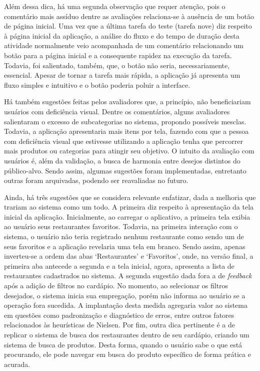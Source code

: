 Além dessa dica, há uma segunda observação que requer atenção, pois o comentário mais assíduo dentre as avaliações relaciona-se à ausência de um botão de página inicial. Uma vez que a última tarefa do teste (tarefa nove) diz respeito à página inicial da aplicação, a análise do fluxo e do tempo de duração desta atividade normalmente veio acompanhada de um comentário relacionando um botão para a página inicial e a consequente rapidez na execução da tarefa. Todavia, foi salientado, também, que, o botão não seria, necessariamente, essencial. Apesar de tornar a tarefa mais rápida, a aplicação já apresenta um fluxo simples e intuitivo e o botão poderia poluir a interface.

Há também sugestões feitas pelos avaliadores que, a princípio, não beneficiariam usuários com deficiência visual. Dentre os comentários, alguns avaliadores salientaram o excesso de subcategorias no sistema, propondo possíveis mesclas. Todavia, a aplicação apresentaria mais itens por tela, fazendo com que a pessoa com deficiência visual que estivesse utilizando a aplicação tenha que percorrer mais produtos ou categorias para atingir seu objetivo. O intuito da avaliação com usuários é, além da validação, a busca de harmonia entre desejos distintos do público-alvo. Sendo assim, algumas sugestões foram implementadas, entretanto outras foram arquivadas, podendo ser reavaliadas no futuro.

Ainda, há três sugestões que se considera relevante enfatizar, dada a melhoria que trariam ao sistema como um todo. A primeira diz respeito à apresentação da tela inicial da aplicação. Inicialmente, ao carregar o aplicativo, a primeira tela exibia ao usuário seus restaurantes favoritos. Todavia, na primeira interação com o sistema, o usuário não teria registrado nenhum restaurante como sendo um de seus favoritos e a aplicação revelaria uma tela em branco. Sendo assim, apenas inverteu-se a ordem das abas ‘Restaurantes’ e ‘Favoritos’, onde, na versão final, a primeira aba antecede a segunda e a tela inicial, agora, apresenta a lista de restaurantes cadastrados no sistema. A segunda sugestão dada fora a de \emph{feedback} após a adição de filtros no cardápio. No momento, ao selecionar os filtros desejados, o sistema inicia sua empregação, porém não informa ao usuário se a operação fora sucedida. A implantação desta medida agregaria valor ao sistema em questões como padronização e diagnóstico de erros, entre outros fatores relacionados às heurísticas de Nielsen. Por fim, outra dica pertinente é a de replicar o sistema de busca dos restaurantes dentro de seu cardápio, criando um sistema de busca de produtos. Desta forma, quando o usuário sabe o que está procurando, ele pode navegar em busca do produto específico de forma prática e acurada.